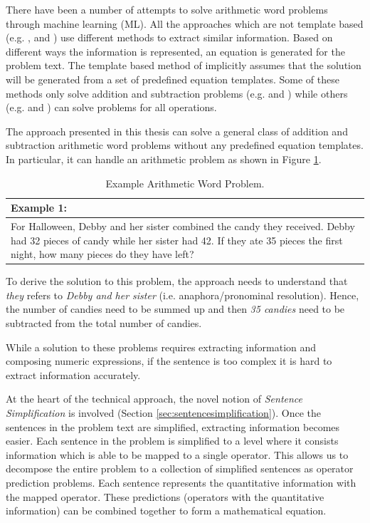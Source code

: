 \documentclass[11pt]{article}
\begin{document}
There have been a number of attempts to solve arithmetic word problems through machine learning (ML). 
All the approaches which are not template based (e.g. \citep{ARIS}, \citep{RoyTACL15} and \citep{RoyR15}) use different methods to extract similar information. Based on different ways the information is represented, an equation is generated for the problem text. The template based method of \citep{Kushman} implicitly assumes that the solution will be generated from a set of predefined equation templates. Some of these methods only solve addition and subtraction problems (e.g. \citep{ARIS} and \citep{RoyTACL15}) while others (e.g. \citep{RoyR15} and \citep{Kushman}) can solve problems for all operations.

The approach presented in this thesis can solve a general class of addition and subtraction arithmetic word problems without any predefined equation templates. In particular, it can handle an arithmetic problem as shown in Figure \ref{figure:1}.

\begin{table}[h!]
\centering
\begin{tabular}{ | m{25em} | }
\hline
\textbf{Example 1:}\\
\hline
For Halloween, Debby and her sister combined the candy they received. Debby had 32 pieces of candy while her sister had 42. If they ate 35 pieces the first night, how many pieces do they have left?\\
\hline
\end{tabular}
\caption{Example Arithmetic Word Problem.}
\label{figure:1}
\end{table}

To derive the solution to this problem, the approach needs to understand that \textit{they} refers to \textit{Debby and her sister} (i.e. anaphora/pronominal resolution). Hence, the number of candies need to be summed up and then \textit{35 candies} need to be subtracted from the total number of candies. 

While a solution to these problems requires extracting information and composing numeric expressions, if the sentence is too complex it is hard to extract information accurately.

At the heart of the technical approach, the novel notion of \textit{Sentence Simplification} is involved (Section \ref{sec:sentencesimplification}). Once the sentences in the problem text are simplified, extracting information becomes easier. Each sentence in the problem is simplified to a level where it consists information which is able to be mapped to a single operator. This allows us to decompose the entire problem to a collection of simplified sentences as operator prediction problems. Each sentence represents the quantitative information with the mapped operator. These predictions (operators with the quantitative information) can be combined together to form a mathematical equation.
\end{document}
